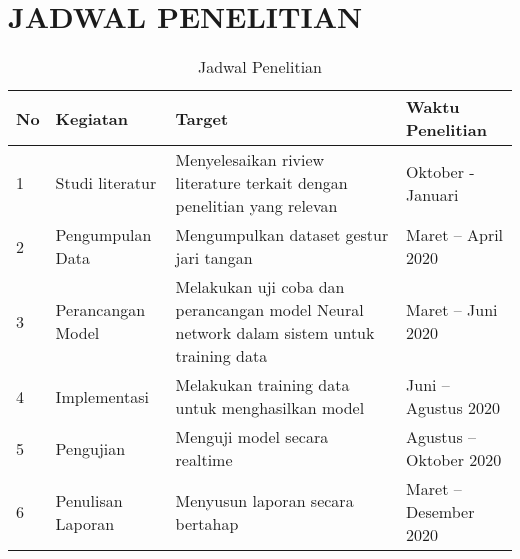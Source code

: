 \chapter{JADWAL PENELITIAN}
\begin{table}[htpb]
	\caption{Jadwal Penelitian}
	\vspace{0.2cm}
	\centering
	\begin{tabular}{|p{0.5cm}|p{4cm}|p{4cm}|p{4cm}|}
		\hline
		No & Kegiatan & Target & Waktu Penelitian \\
		\hline
		1 & Studi literatur & Menyelesaikan riview literature terkait dengan penelitian yang relevan & Oktober - Januari \\ 
		\hline
		2 & Pengumpulan Data & Mengumpulkan dataset gestur jari tangan & Maret  – April 2020\\
		\hline
		3 & Perancangan Model & Melakukan uji coba dan perancangan model Neural network dalam sistem untuk training data & Maret – Juni 2020 \\
		\hline
		4 & Implementasi & Melakukan training data untuk menghasilkan model & Juni – Agustus 2020 \\
		\hline
		5 & Pengujian & Menguji model secara realtime & Agustus – Oktober 2020 \\
		\hline
		6 & Penulisan  Laporan & Menyusun laporan secara bertahap & Maret – Desember 2020\\
		\hline
		
	\end{tabular}
\end{table}
